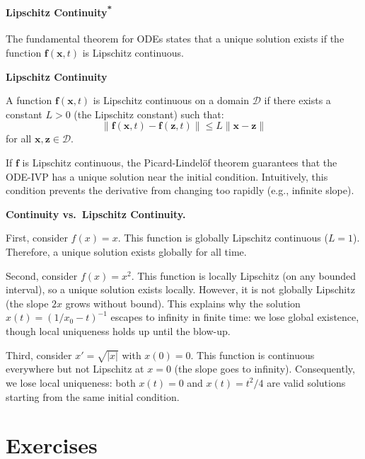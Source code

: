 \paragraph*{\texorpdfstring{Lipschitz Continuity\textsuperscript{*}}{Lipschitz Continuity}}
The fundamental theorem for ODEs states that a unique solution exists if the function $\mathbf{f}(\mathbf{x}, t)$ is Lipschitz continuous. 
\begin{definitionBox}
    \textbf{Lipschitz Continuity}
    
    A function $\mathbf{f}(\mathbf{x}, t)$ is Lipschitz continuous on a domain $\mathcal{D}$ if there exists a constant $L > 0$ (the Lipschitz constant) such that:
    \begin{equation}
        \| \mathbf{f}(\mathbf{x}, t) - \mathbf{f}(\mathbf{z}, t) \| \le L \| \mathbf{x} - \mathbf{z} \|
    \end{equation}
    for all $\mathbf{x}, \mathbf{z} \in \mathcal{D}$.
\end{definitionBox}
If $\mathbf{f}$ is Lipschitz continuous, the Picard-Lindel\"of theorem guarantees that the ODE-IVP has a unique solution near the initial condition. Intuitively, this condition prevents the derivative from changing too rapidly (e.g., infinite slope).

\begin{exampleBox}
    \textbf{Continuity vs.\ Lipschitz Continuity.}
    
    First, consider $f(x) = x$. This function is globally Lipschitz continuous ($L=1$). Therefore, a unique solution exists globally for all time.
    
    Second, consider $f(x) = x^2$. This function is locally Lipschitz (on any bounded interval), so a unique solution exists locally. However, it is not globally Lipschitz (the slope $2x$ grows without bound). This explains why the solution $x(t) = (1/x_0 - t)^{-1}$ escapes to infinity in finite time: we lose global existence, though local uniqueness holds up until the blow-up.
    
    Third, consider $x' = \sqrt{|x|}$ with $x(0) = 0$. This function is continuous everywhere but not Lipschitz at $x=0$ (the slope goes to infinity). Consequently, we lose local uniqueness: both $x(t) = 0$ and $x(t) = t^2/4$ are valid solutions starting from the same initial condition.
\end{exampleBox}


\section{Exercises}


